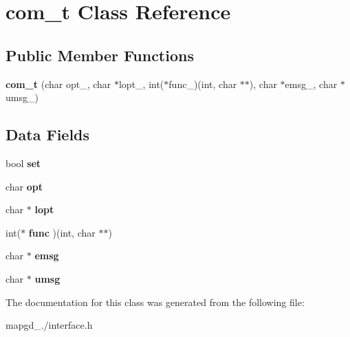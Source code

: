 \hypertarget{classcom__t}{\section{com\-\_\-t Class Reference}
\label{classcom__t}
}
\subsection*{Public Member Functions}
\begin{DoxyCompactItemize}
\item 
\hypertarget{classcom__t_ab94dc9902c7ffb72768825bb9dc5afda}{{\bfseries com\-\_\-t} (char opt\-\_\-, char $\ast$lopt\-\_\-, int($\ast$func\-\_\-)(int, char $\ast$$\ast$), char $\ast$emsg\-\_\-, char $\ast$umsg\-\_\-)}\label{classcom__t_ab94dc9902c7ffb72768825bb9dc5afda}

\end{DoxyCompactItemize}
\subsection*{Data Fields}
\begin{DoxyCompactItemize}
\item 
\hypertarget{classcom__t_ae8b6c03d7ec9397c7570295b9f0162fc}{bool {\bfseries set}}\label{classcom__t_ae8b6c03d7ec9397c7570295b9f0162fc}

\item 
\hypertarget{classcom__t_a221c5d1fb0f1d23299526c0efb7c131d}{char {\bfseries opt}}\label{classcom__t_a221c5d1fb0f1d23299526c0efb7c131d}

\item 
\hypertarget{classcom__t_a9fc395b3e6669f5370ff4c4281202a9e}{char $\ast$ {\bfseries lopt}}\label{classcom__t_a9fc395b3e6669f5370ff4c4281202a9e}

\item 
\hypertarget{classcom__t_a04457e8446cd906b5bed24c43077979d}{int($\ast$ {\bfseries func} )(int, char $\ast$$\ast$)}\label{classcom__t_a04457e8446cd906b5bed24c43077979d}

\item 
\hypertarget{classcom__t_a335660c29bfa0cf5e324a3d54704f351}{char $\ast$ {\bfseries emsg}}\label{classcom__t_a335660c29bfa0cf5e324a3d54704f351}

\item 
\hypertarget{classcom__t_a2c4d760c9849ab6c4fd24258ee9bd194}{char $\ast$ {\bfseries umsg}}\label{classcom__t_a2c4d760c9849ab6c4fd24258ee9bd194}

\end{DoxyCompactItemize}


The documentation for this class was generated from the following file\-:\begin{DoxyCompactItemize}
\item 
mapgd\-\_./interface.\-h\end{DoxyCompactItemize}
